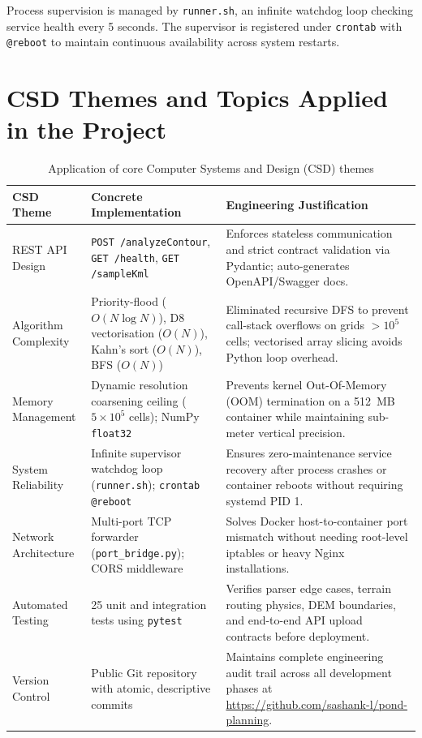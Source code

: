 \documentclass[manuscript,screen,review]{acmart}
\begin{document}
Process supervision is managed by \texttt{runner.sh}, an infinite watchdog loop checking service health
every 5 seconds. The supervisor is registered under \texttt{crontab} with \texttt{@reboot} to maintain
continuous availability across system restarts.

\section{CSD Themes and Topics Applied in the Project}
\label{sec:csd-themes}

\begin{table}[t]
  \caption{Application of core Computer Systems and Design (CSD) themes}
  \label{tab:csd-themes}
  \begin{tabular}{p{2.6cm}p{5.0cm}p{6.8cm}}
    \toprule
    CSD Theme & Concrete Implementation & Engineering Justification \\
    \midrule
    REST API Design & \texttt{POST /analyzeContour}, \texttt{GET /health}, \texttt{GET /sampleKml} &
      Enforces stateless communication and strict contract validation via Pydantic; auto-generates OpenAPI/Swagger docs. \\
    Algorithm Complexity & Priority-flood ($O(N \log N)$), D8 vectorisation ($O(N)$), Kahn's sort ($O(N)$), BFS ($O(N)$) &
      Eliminated recursive DFS to prevent call-stack overflows on grids $>10^5$ cells; vectorised array slicing avoids Python loop overhead. \\
    Memory Management & Dynamic resolution coarsening ceiling ($5 \times 10^5$ cells); NumPy \texttt{float32} &
      Prevents kernel Out-Of-Memory (OOM) termination on a 512~MB container while maintaining sub-meter vertical precision. \\
    System Reliability & Infinite supervisor watchdog loop (\texttt{runner.sh}); \texttt{crontab @reboot} &
      Ensures zero-maintenance service recovery after process crashes or container reboots without requiring systemd PID 1. \\
    Network Architecture & Multi-port TCP forwarder (\texttt{port\_bridge.py}); CORS middleware &
      Solves Docker host-to-container port mismatch without needing root-level iptables or heavy Nginx installations. \\
    Automated Testing & 25 unit and integration tests using \texttt{pytest} &
      Verifies parser edge cases, terrain routing physics, DEM boundaries, and end-to-end API upload contracts before deployment. \\
    Version Control & Public Git repository with atomic, descriptive commits &
      Maintains complete engineering audit trail across all development phases at \url{https://github.com/sashank-l/pond-planning}. \\
    \bottomrule
  \end{tabular}
\end{table}
\end{document}
